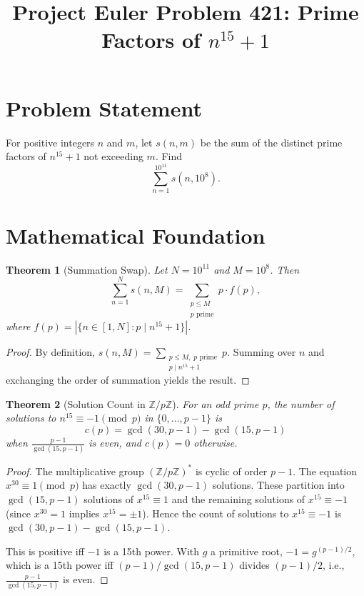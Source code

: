 \documentclass[12pt]{article}
\title{Project Euler Problem 421: Prime Factors of $n^{15}+1$}
\author{}
\date{}
\newtheorem{theorem}{Theorem}
\begin{document}
\maketitle

\section{Problem Statement}
For positive integers $n$ and $m$, let $s(n,m)$ be the sum of the distinct prime factors of $n^{15}+1$ not exceeding $m$. Find
\[
\sum_{n=1}^{10^{11}} s(n, 10^8).
\]

\section{Mathematical Foundation}

\begin{theorem}[Summation Swap]
Let $N = 10^{11}$ and $M = 10^8$. Then
\[
\sum_{n=1}^{N} s(n,M) = \sum_{\substack{p \le M \\ p \text{ prime}}} p \cdot f(p),
\]
where $f(p) = |\{n \in [1,N] : p \mid n^{15}+1\}|$.
\end{theorem}

\begin{proof}
By definition, $s(n,M) = \sum_{\substack{p \le M,\; p \text{ prime} \\ p \mid n^{15}+1}} p$. Summing over $n$ and exchanging the order of summation yields the result.
\end{proof}

\begin{theorem}[Solution Count in $\mathbb{Z}/p\mathbb{Z}$]
For an odd prime $p$, the number of solutions to $n^{15} \equiv -1 \pmod{p}$ in $\{0,\ldots,p-1\}$ is
\[
c(p) = \gcd(30, p-1) - \gcd(15, p-1)
\]
when $\frac{p-1}{\gcd(15,p-1)}$ is even, and $c(p)=0$ otherwise.
\end{theorem}

\begin{proof}
The multiplicative group $(\mathbb{Z}/p\mathbb{Z})^*$ is cyclic of order $p-1$. The equation $x^{30} \equiv 1 \pmod{p}$ has exactly $\gcd(30,p-1)$ solutions. These partition into $\gcd(15,p-1)$ solutions of $x^{15} \equiv 1$ and the remaining solutions of $x^{15} \equiv -1$ (since $x^{30}=1$ implies $x^{15} = \pm 1$). Hence the count of solutions to $x^{15}\equiv -1$ is $\gcd(30,p-1) - \gcd(15,p-1)$.

This is positive iff $-1$ is a 15th power. With $g$ a primitive root, $-1 = g^{(p-1)/2}$, which is a 15th power iff $(p-1)/\gcd(15,p-1)$ divides $(p-1)/2$, i.e., $\frac{p-1}{\gcd(15,p-1)}$ is even.
\end{proof}
\end{document}
